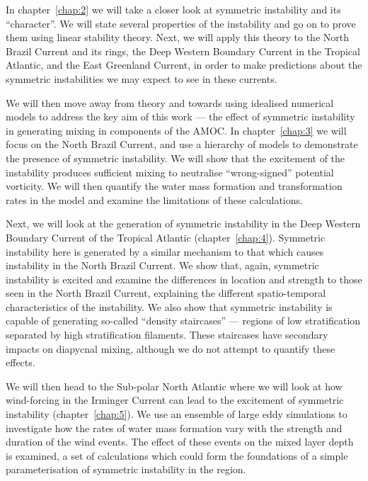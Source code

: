 In chapter~\ref{chap:2} we will take a closer look at symmetric instability and its ``character''. We will state several properties of the instability and go on to prove them using linear stability theory. Next, we will apply this theory to the North Brazil Current and its rings, the Deep Western Boundary Current in the Tropical Atlantic, and the East Greenland Current, in order to make predictions about the symmetric instabilities we may expect to see in these currents.

We will then move away from theory and towards using idealised numerical models to address the key aim of this work --- the effect of symmetric instability in generating mixing in components of the AMOC. In chapter~\ref{chap:3} we will focus on the North Brazil Current, and use a hierarchy of models to demonstrate the presence of symmetric instability. We will show that the excitement of the instability produces sufficient mixing to neutralise ``wrong-signed'' potential vorticity. We will then quantify the water mass formation and transformation rates in the model and examine the limitations of these calculations.

Next, we will look at the generation of symmetric instability in the Deep Western Boundary Current of the Tropical Atlantic (chapter~\ref{chap:4}). Symmetric instability here is generated by a similar mechanism to that which causes instability in the North Brazil Current. We show that, again, symmetric instability is excited and examine the differences in location and strength to those seen in the North Brazil Current, explaining the different spatio-temporal characteristics of the instability. We also show that symmetric instability is capable of generating so-called ``density staircases'' --- regions of low stratification separated by high stratification filaments. These staircases have secondary impacts on diapycnal mixing, although we do not attempt to quantify these effects.

We will then head to the Sub-polar North Atlantic where we will look at how wind-forcing in the Irminger Current can lead to the excitement of symmetric instability (chapter~\ref{chap:5}). We use an ensemble of large eddy simulations to investigate how the rates of water mass formation vary with the strength and duration of the wind events. The effect of these events on the mixed layer depth is examined, a set of calculations which could form the foundations of a simple parameterisation of symmetric instability in the region.
